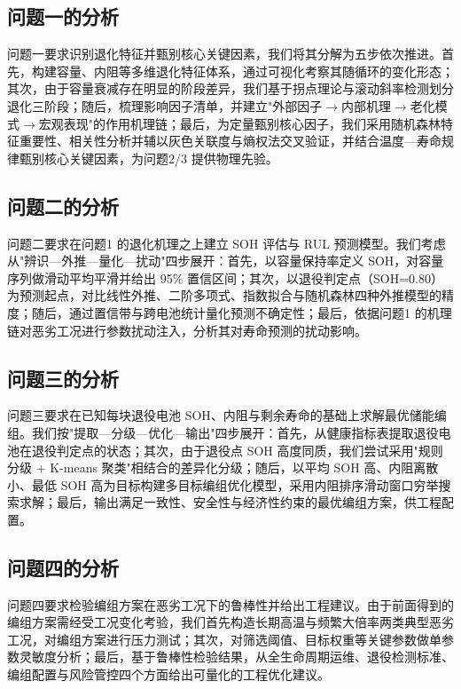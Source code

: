 \documentclass[withoutpreface]{cumcmthesis}
\begin{document}
\subsection{问题一的分析}
问题一要求识别退化特征并甄别核心关键因素，我们将其分解为五步依次推进。首先，构建容量、内阻等多维退化特征体系，通过可视化考察其随循环的变化形态；其次，由于容量衰减存在明显的阶段差异，我们基于拐点理论与滚动斜率检测划分退化三阶段；随后，梳理影响因子清单，并建立"外部因子$\to$内部机理$\to$老化模式$\to$宏观表现"的作用机理链；最后，为定量甄别核心因子，我们采用随机森林特征重要性、相关性分析并辅以灰色关联度与熵权法交叉验证，并结合温度—寿命规律甄别核心关键因素，为问题2/3 提供物理先验。

\subsection{问题二的分析}
问题二要求在问题1 的退化机理之上建立 SOH 评估与 RUL 预测模型。我们考虑从"辨识—外推—量化—扰动"四步展开：首先，以容量保持率定义 SOH，对容量序列做滑动平均平滑并给出 95\% 置信区间；其次，以退役判定点（SOH=0.80）为预测起点，对比线性外推、二阶多项式、指数拟合与随机森林四种外推模型的精度；随后，通过置信带与跨电池统计量化预测不确定性；最后，依据问题1 的机理链对恶劣工况进行参数扰动注入，分析其对寿命预测的扰动影响。

\subsection{问题三的分析}
问题三要求在已知每块退役电池 SOH、内阻与剩余寿命的基础上求解最优储能编组。我们按"提取—分级—优化—输出"四步展开：首先，从健康指标表提取退役电池在退役判定点的状态；其次，由于退役点 SOH 高度同质，我们尝试采用"规则分级 + K-means 聚类"相结合的差异化分级；随后，以平均 SOH 高、内阻离散小、最低 SOH 高为目标构建多目标编组优化模型，采用内阻排序滑动窗口穷举搜索求解；最后，输出满足一致性、安全性与经济性约束的最优编组方案，供工程配置。

\subsection{问题四的分析}
问题四要求检验编组方案在恶劣工况下的鲁棒性并给出工程建议。由于前面得到的编组方案需经受工况变化考验，我们首先构造长期高温与频繁大倍率两类典型恶劣工况，对编组方案进行压力测试；其次，对筛选阈值、目标权重等关键参数做单参数灵敏度分析；最后，基于鲁棒性检验结果，从全生命周期运维、退役检测标准、编组配置与风险管控四个方面给出可量化的工程优化建议。
\end{document}
